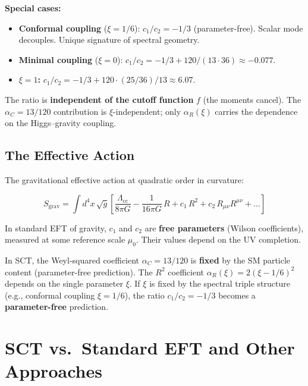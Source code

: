 \documentclass[11pt,a4paper]{article}
\begin{document}
\noindent
\textbf{Special cases:}
\begin{itemize}
  \item \textbf{Conformal coupling} ($\xi = 1/6$): $c_1/c_2 = -1/3$ (parameter-free).
    Scalar mode decouples. Unique signature of spectral geometry.
  \item \textbf{Minimal coupling} ($\xi = 0$): $c_1/c_2 = -1/3 + 120/(13\!\cdot\!36) \approx -0.077$.
  \item \textbf{$\xi = 1$:} $c_1/c_2 = -1/3 + 120\!\cdot\!(25/36)/13 \approx 6.07$.
\end{itemize}

\noindent
The ratio is \textbf{independent of the cutoff function} $f$ (the moments cancel).
The $\alpha_C = 13/120$ contribution is $\xi$-independent; only $\alpha_R(\xi)$ carries
the dependence on the Higgs--gravity coupling.

\subsection{The Effective Action}

The gravitational effective action at quadratic order in curvature:

\begin{equation}
  S_{\text{grav}} = \int d^4x\,\sqrt{g}\left[
    \frac{\Lambda_{\text{cc}}}{8\pi G}
    - \frac{1}{16\pi G}\,R
    + c_1\,R^2
    + c_2\,R_{\mu\nu}R^{\mu\nu}
    + \ldots
  \right]
  \label{eq:effective-action}
\end{equation}

In standard EFT of gravity, $c_1$ and $c_2$ are \textbf{free parameters} (Wilson coefficients), measured at some reference scale $\mu_0$. Their values depend on the UV completion.

In SCT, the Weyl-squared coefficient $\alpha_C = 13/120$ is \textbf{fixed} by the SM particle
content (parameter-free prediction). The $R^2$ coefficient $\alpha_R(\xi) = 2(\xi-1/6)^2$
depends on the single parameter $\xi$. If $\xi$ is fixed by the spectral triple
structure (e.g., conformal coupling $\xi = 1/6$), the ratio $c_1/c_2 = -1/3$ becomes
a \textbf{parameter-free} prediction.

\section{SCT vs.\ Standard EFT and Other Approaches}
\end{document}
